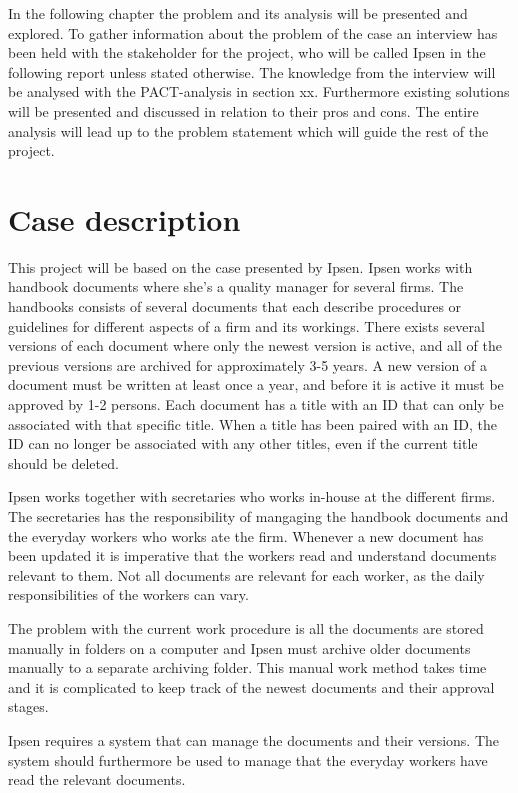 In the following chapter the problem and its analysis will be presented and explored. 
To gather information about the problem of the case an interview has been held with the stakeholder for the project, who will be called Ipsen in the following report unless stated otherwise.
The knowledge from the interview will be analysed with the PACT-analysis in section xx.
Furthermore existing solutions will be presented and discussed in relation to their pros and cons.
The entire analysis will lead up to the problem statement which will guide the rest of the project.

\section{Case description} \label{case}

This project will be based on the case presented by Ipsen.
Ipsen works with handbook documents where she's a quality manager for several firms.
The handbooks consists of several documents that each describe procedures or guidelines for different aspects of a firm and its workings.
There exists several versions of each document where only the newest version is active, and all of the previous versions are archived for approximately 3-5 years.
A new version of a document must be written at least once a year, and before it is active it must be approved by 1-2 persons.
Each document has a title with an ID that can only be associated with that specific title. 
When a title has been paired with an ID, the ID can no longer be associated with any other titles, even if the current title should be deleted.

Ipsen works together with secretaries who works in-house at the different firms.
The secretaries has the responsibility of mangaging the handbook documents and the everyday workers who works ate the firm.
Whenever a new document has been updated it is imperative that the workers read and understand documents relevant to them.
Not all documents are relevant for each worker, as the daily responsibilities of the workers can vary.

The problem with the current work procedure is all the documents are stored manually in folders on a computer and Ipsen must archive older documents manually to a separate archiving folder. This manual work method takes time and it is complicated to keep track of the newest documents and their approval stages.

Ipsen requires a system that can manage the documents and their versions.
The system should furthermore be used to manage that the everyday workers have read the relevant documents.